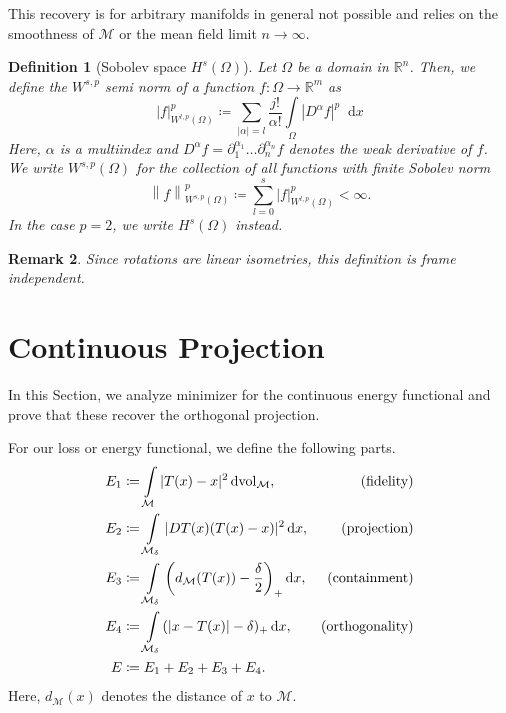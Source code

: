 \documentclass[11pt]{amsart}%
\newcommand*{\dd}{\mathop{}\!\mathrm{d}}
\newcommand{\norm}[1]{\left\lVert#1\right\rVert}
\newcommand*{\vol}{\rm{vol}}
\theoremstyle{plain}
\newtheorem{definition}{Definition}[section]
\newtheorem{remark}[definition]{Remark}
\newcommand{\1}{\mathbf{1}}
\newcommand{\M}{\mathcal{M}}
\begin{document}
This recovery is for arbitrary manifolds in general not possible and relies on the smoothness of $\M$ or the mean field limit $n\to \infty$.

\begin{definition}[Sobolev space $H^s(\Omega)$]
    Let $\Omega$ be a domain in $\mathbb{R}^n$. Then, we define the $W^{s,p}$ semi norm of a function $f:\Omega\to \mathbb{R}^m$ as
    $$|f|_{W^{l,p}(\Omega)}^p\coloneqq \sum\limits_{|\alpha|=l} \frac{j!}{\alpha!}\int\limits_\Omega |D^\alpha f|^p\dd x$$
    Here, $\alpha$ is a multiindex and $D^\alpha f=\partial^{\alpha_1}_1\dots\partial^{\alpha_n}_n f$ denotes the weak derivative of $f$.
    We write $W^{s,p}(\Omega)$ for the collection of all functions with finite Sobolev norm
    $$\norm{f}_{W^{s,p}(\Omega)}^p\coloneqq \sum\limits_{l=0}^s|f|_{W^{l,p}(\Omega)}^p<\infty.$$
    In the case $p=2$, we write $H^s(\Omega)$ instead.
\end{definition}

\begin{remark}
    Since rotations are linear isometries, this definition is frame independent.
\end{remark}

\section{Continuous Projection}
\label{Sec:Projection}

In this Section, we analyze minimizer for the continuous energy functional and prove that these recover the orthogonal projection.

For our loss or energy functional, we define the following parts.
\begin{align}
    E_1&\coloneqq \int\limits_\M |T(x)-x|^2\dd \vol_\M, \label{eqn:E1def}&\text{(fidelity)}\\
    E_2&\coloneqq \int\limits_{\M_\delta} |DT(x)(T(x)-x)|^2 \dd x, \label{eqn:E2def}&\text{(projection)}\\
    E_3&\coloneqq \int\limits_{\M_\delta} \left(d_\M(T(x))-\frac{\delta}{2}\right)_+\dd x, \label{eqn:E3def}&\text{(containment)}\\
    E_4&\coloneqq \int\limits_{\M_\delta} (|x-T(x)|-\delta)_+\dd x, \label{eqn:E4def}&\text{(orthogonality)}\\
    E&\coloneqq E_1+E_2+E_3+E_4.\label{eqn:Edef}
\end{align}
Here, $d_\M(x)$ denotes the distance of $x$ to $\M$.
\end{document}
